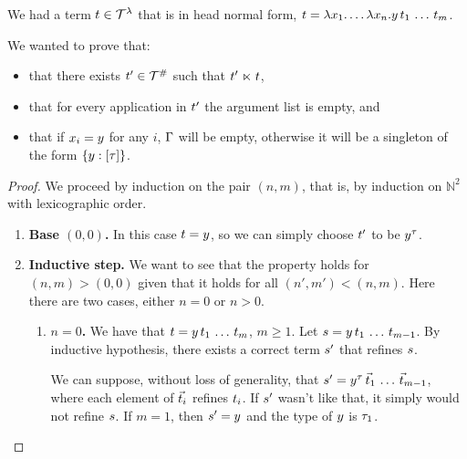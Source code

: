 
We had a term $t \in \mathcal{T}^{\lambda}$ that is in head normal form,
\ie $t = \lambda x_1. \hdots\lambda x_n. y\,t_1\,\hdots\,t_m$.

We wanted to prove that:
  \begin{itemize}
    \item that there exists $t' \in \mathcal{T}^{\mathtt{\#}}$ such that $t' \mathrel{\ltimes} t$,
    \item that for every application in $t'$ the argument list is empty, and
    \item that if $x_i = y$ for any $i$, $\Gamma$ will be empty,
      otherwise it will be a singleton of the form $\{y : [\tau]\}$.
  \end{itemize}

\begin{proof}
We proceed by induction on the pair $(n, m)$, that is, by induction on
  $\mathbb{N}^2$ with lexicographic order.
\begin{enumerate}
  \item {\bf Base $(0, 0)$.} In this case $t = y$,
    so we can simply choose $t'$ to be $y^\tau$.
  \item {\bf Inductive step.} We want to see that the property holds for
    $(n, m) > (0,0)$ given that it holds for all $(n', m') < (n, m)$.
    Here there are two cases, either $n = 0$ or $n > 0$.
    \begin{enumerate}
      \item {\bf $n = 0$.} We have that $t = y\,t_1\,\hdots\,t_m$, $m \geq 1$.
        Let $s = y\,t_1\,\hdots\,t_{m-1}$.
        By inductive hypothesis, there exists a correct term $s'$ that
          refines $s$.

        We can suppose, without loss of generality, that
          $s' = y^\tau\,\vec{t}_1\,\hdots\,\vec{t}_{m-1}$,
        where each element of $\vec{t}_i$ refines $t_i$.
        If $s'$ wasn't like that, it simply would not refine $s$.
        If $m = 1$, then $s' = y$ and the type of $y$ is $\tau_1$.


\end{enumerate}
\end{enumerate}
\end{proof}
